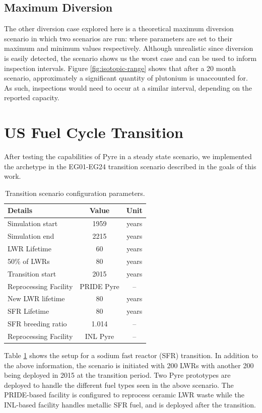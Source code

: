 \subsection{Maximum Diversion}
The other diversion case explored here is a theoretical maximum diversion scenario in which two scenarios are run: where parameters are set to their maximum and minimum values
respectively. Although unrealistic since diversion is easily detected, the scenario shows us the worst case and can be used to inform inspection intervals.
Figure \ref{fig:isotopic-range} shows that after a 20 month scenario, approximately a significant quantity of plutonium is unaccounted for. As such, inspections would need to occur
at a similar interval, depending on the reported capacity.

\section{US Fuel Cycle Transition}

After testing the capabilities of Pyre in a steady state scenario, we implemented the archetype in the EG01-EG24 transition scenario described in the goals of this work. 

\begin{table}[h]
	\centering
	\begin{tabularx}{0.5\linewidth}{lcc}
		\hline
		\textbf{Details} & \textbf{Value} & \textbf{Unit} \\
		\hline \hline
		Simulation start & 1959 & years \\ \hline
		Simulation end & 2215 & years \\ \hline
		LWR Lifetime & 60 & years \\ 
		50\% of LWRs & 80 & years \\ \hline
		Transition start & 2015 & years \\ \hline
		Reprocessing Facility & PRIDE Pyre & -- \\ \hline
		New LWR lifetime & 80 & years \\ \hline
		SFR Lifetime & 80 & years \\ \hline
		SFR breeding ratio & 1.014 & -- \\ \hline
		Reprocessing Facility & INL Pyre & -- \\ \hline
	\end{tabularx}
	\caption {Transition scenario configuration parameters.}
	\label {tab:setup}
\end{table}

Table \ref{tab:setup} shows the setup for a sodium fast reactor (SFR) transition. In addition to the above information, the scenario is initiated with 200 LWRs with another 200 being deployed
in 2015 at the transition period. Two Pyre prototypes are deployed to handle the different fuel types seen in the above scenario. The PRIDE-based facility is configured to reprocess ceramic
LWR waste while the INL-based facility handles metallic SFR fuel, and is deployed after the transition. 

